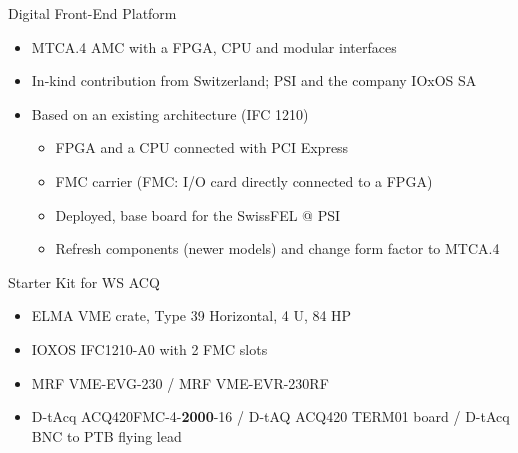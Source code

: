 \documentclass[
  9pt
  , table
  , ignorenonframetext
]{beamer}
\begin{document}
\begin{frame}{Digital Front-End Platform}
  \begin{itemize}
  \item MTCA.4 AMC with a FPGA, CPU and modular interfaces
  \item In-kind contribution from Switzerland; PSI and the company IOxOS SA
  \item Based on an existing architecture (IFC 1210)
    \begin{itemize}
    \item FPGA and a CPU connected with PCI Express
    \item FMC carrier (FMC: I/O card directly connected to a FPGA)
    \item Deployed, base board for the SwissFEL @ PSI
    \item Refresh components (newer models) and change form factor to MTCA.4
    \end{itemize}
  \end{itemize}
  \begin{exampleblock}{Starter Kit for WS ACQ}
    \begin{itemize}
    \item ELMA VME crate, Type 39 Horizontal, 4 U, 84 HP 
    \item IOXOS IFC1210-A0 with 2 FMC slots
    \item MRF VME-EVG-230 / MRF VME-EVR-230RF
    \item D-tAcq ACQ420FMC-4-\textbf{2000}-16 / D-tAQ ACQ420 TERM01 board / D-tAcq BNC to PTB flying lead
     \end{itemize}
  \end{exampleblock}
\end{frame}
\end{document}
